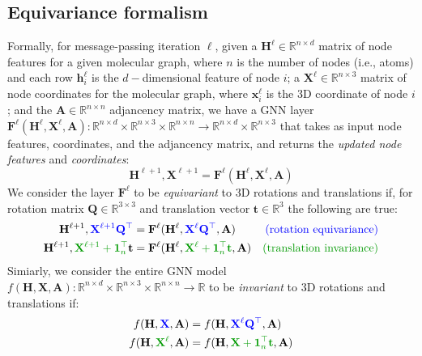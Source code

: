 \subsection{Equivariance formalism}
Formally, for message-passing iteration $\ell$, given a $\mathbf{H}^{\ell}\in\mathbb{R}^{n \times d}$ matrix of node features for a given molecular graph, where $n$ is the number of nodes (i.e., atoms) and each row $\mathbf{h}^{\ell}_i$ is the $d-$dimensional feature of node $i$; a $\textbf{X}^{\ell}\in \mathbb{R}^{n \times 3}$ matrix of node coordinates for the molecular graph, where $\mathbf{x}^{\ell}_i$ is the 3D coordinate of node $i$; and the $\mathbf{A}\in\mathbb{R}^{n \times n}$ adjancency matrix, 
we have a GNN layer $\mathbf{F}^{\ell}(\mathbf{H}^{\ell}, \mathbf{X}^{\ell}, \mathbf{A}):\mathbb{R}^{n \times d}\times \mathbb{R}^{n \times 3} \times \mathbb{R}^{n \times n} \rightarrow \mathbb{R}^{n \times d} \times \mathbb{R}^{n \times 3}$ that takes as input node features, coordinates, and the adjancency matrix, and returns the \textit{updated node features} and \textit{coordinates}:
\begin{equation}
    \mathbf{H}^{\ell +1},\mathbf{X}^{\ell + 1} = \mathbf{F}^{\ell}(\mathbf{H}^{\ell}, \mathbf{X}^{\ell}, \mathbf{A})
\end{equation} 
We consider the layer $\mathbf{F}^{\ell}$ to be \textit{equivariant} to 3D rotations and translations if, for rotation matrix $\mathbf{Q}\in \mathbb{R}^{3 \times 3}$ and translation vector $\mathbf{t}\in \mathbb{R}^3$ the following are true:
\begin{align}
    \mathbf{H}^{\ell + 1}, {\color{blue}\mathbf{X}^{\ell + 1}\mathbf{Q}^{\top}} &= \mathbf{F}^{\ell}(\mathbf{H}^{\ell}, {\color{blue}\mathbf{X}^{\ell}\mathbf{Q}^{\top}}, \mathbf{A}) &\text{{\color{blue}(rotation equivariance)}} \\
    \mathbf{H}^{\ell + 1}, {\color{green!60!black}\mathbf{X}^{\ell + 1} + \mathbf{1}_n^{\top}}\mathbf{t} &= \mathbf{F}^{\ell}(\mathbf{H}^{\ell}, {\color{green!60!black}\mathbf{X}^{\ell} + \mathbf{1}_n^{\top}\mathbf{t}}, \mathbf{A}) &\text{{\color{green!60!black}(translation invariance)}}
\end{align}
Simiarly, we consider the entire GNN model $f(\mathbf{H}, \mathbf{X}, \mathbf{A}):\mathbb{R}^{n\times d}\times\mathbb{R}^{n\times 3}\times \mathbb{R}^{n \times n} \rightarrow \mathbb{R}$ to be \textit{invariant} to 3D rotations and translations if:
\begin{align}
    f(\mathbf{H}, {\color{blue}\mathbf{X}}, \mathbf{A}) &= f(\mathbf{H}, {\color{blue}\mathbf{X}^{\ell}\mathbf{Q}^{\top}}, \mathbf{A}) \\
    f(\mathbf{H},  {\color{green!60!black}\mathbf{X}^{\ell}}, \mathbf{A}) &= f(\mathbf{H}, {\color{green!60!black}\mathbf{X}+ \mathbf{1}_n^{\top}\mathbf{t}}, \mathbf{A})
\end{align}

